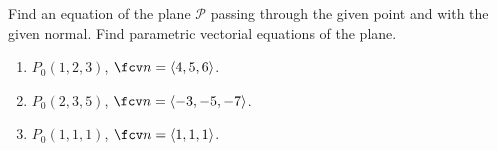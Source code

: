 Find an equation of the plane $\mathcal P$ passing through the given point and with the given normal. Find parametric vectorial equations of the plane.

\begin{enumerate}
\item \label{problemFindPlaneFromP(1,2,3)andn(4,5,6)} $P_0(1,2,3) $,  $\fcv n= \langle 4, 5, 6 \rangle$.


\item $P_0(2,3,5) $,  $\fcv n= \langle-3, -5, -7 \rangle$.

\item $P_0(1, 1, 1)$, $\fcv n= \langle 1,1,1 \rangle$.

\end{enumerate}